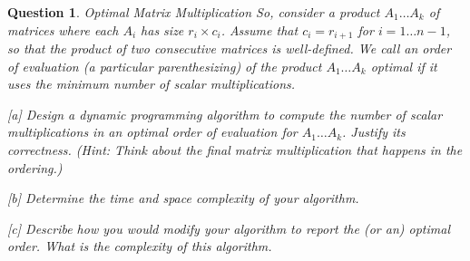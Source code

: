 \documentclass[10pt]{article}
\newtheorem{question}{Question}
\begin{document}
\begin{question}{Optimal Matrix Multiplication}
So, consider a product $A_1 \ldots A_k$ of matrices where each $A_i$ has size $r_i \times c_i$.  Assume that $c_i = r_{i+1}$ for $i = 1 \ldots n-1$, so that the product of two consecutive matrices is well-defined.
We call an order of evaluation (a particular parenthesizing) of the product $A_1 \ldots A_k$ {\em optimal} if it uses the minimum number of scalar multiplications.
\begin{description}
\item{[a]} Design a dynamic programming algorithm to compute the number of scalar multiplications in an optimal order of evaluation for $A_1 \ldots A_k$.  Justify its correctness.
(Hint: Think about the final matrix multiplication that happens in the ordering.)
\item{[b]} Determine the time and space complexity of your algorithm.
\item{[c]} Describe how you would modify your algorithm to report the (or an) optimal order.  What is the complexity of this algorithm.
\end{description}
\end{question}
\end{document}
